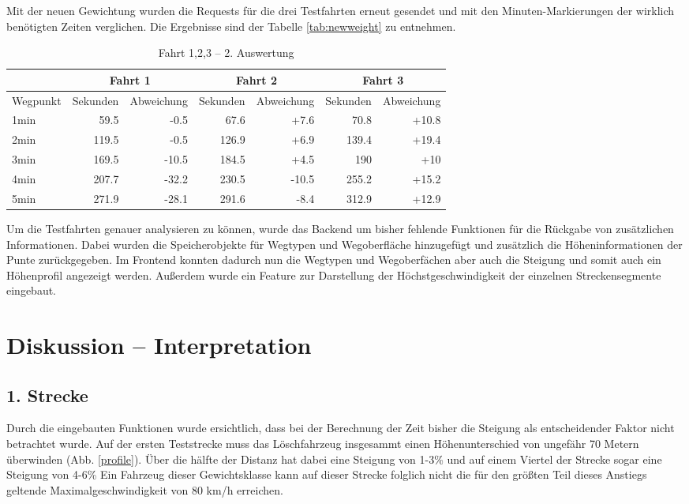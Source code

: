 \documentclass[12pt,a4paper]{article}
\begin{document}
Mit der neuen Gewichtung wurden die Requests für die drei Testfahrten erneut gesendet und mit den Minuten-Markierungen der wirklich benötigten Zeiten verglichen.
Die Ergebnisse sind der Tabelle \ref{tab:newweight} zu entnehmen.

\begin{table}[]
\centering
\caption{Fahrt 1,2,3 -- 2. Auswertung}
\label{tab:all}
\begin{tabular}{|l|r|r|r|r|r|r|}
\hline
\multicolumn{1}{l}{} & \multicolumn{2}{c}{Fahrt 1} & \multicolumn{2}{c}{Fahrt 2} & \multicolumn{2}{c}{Fahrt 3} \\ \hline
Wegpunkt & Sekunden & Abweichung & Sekunden & Abweichung & Sekunden & Abweichung \\ \hline 
1min & 59.5 & -0.5 & 67.6 & +7.6 & 70.8 & +10.8  \\
2min & 119.5 & -0.5 & 126.9 & +6.9 & 139.4 & +19.4  \\
3min & 169.5 & -10.5 & 184.5 & +4.5 & 190 & +10  \\
4min & 207.7 & -32.2 & 230.5 & -10.5 & 255.2 & +15.2  \\
5min & 271.9 & -28.1 &  291.6 & -8.4 & 312.9 & +12.9   \\
\hline
\end{tabular}
\end{table}


Um die Testfahrten genauer analysieren zu können, wurde das Backend um bisher fehlende Funktionen für die Rückgabe von zusätzlichen Informationen. Dabei wurden die Speicherobjekte für Wegtypen und Wegoberfläche hinzugefügt und zusätzlich die Höheninformationen der Punte zurückgegeben. Im Frontend konnten dadurch nun die Wegtypen und Wegoberfächen aber auch die Steigung und somit auch ein Höhenprofil angezeigt werden. Außerdem wurde ein Feature zur Darstellung der Höchstgeschwindigkeit der einzelnen Streckensegmente eingebaut. 

\newpage
\section{Diskussion -- Interpretation}

\subsection{1. Strecke}

Durch die eingebauten Funktionen wurde ersichtlich, dass bei der Berechnung der Zeit bisher die Steigung als entscheidender Faktor nicht betrachtet wurde. Auf der ersten Teststrecke muss das Löschfahrzeug insgesammt einen Höhenunterschied von ungefähr 70 Metern überwinden (Abb. \ref{profile}). Über die hälfte der Distanz hat dabei eine Steigung von 1-3\% und auf einem Viertel der Strecke sogar eine Steigung von 4-6\%  Ein Fahrzeug dieser Gewichtsklasse kann auf dieser Strecke folglich nicht die für den größten Teil dieses Anstiegs geltende Maximalgeschwindigkeit von 80 km/h erreichen.
\end{document}
